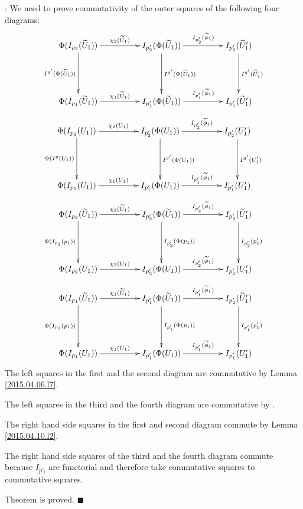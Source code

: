 \documentclass[12pt]{article}
\numberwithin{equation}{section}
\newenvironment{myproof}{{\bf Proof}:}{$\blacksquare$ \vskip 5mm }
\newcommand{\wt}{\widetilde}
\begin{document}
\begin{myproof}
We need to prove commutativity of the outer squares of the following four diagrams:
%
$$
\begin{xy}
          \xymatrix@C=4pc@R=4pc{
                 \Phi(I_{p_2}(\wt{U}_1))  \ar[r]^-{\chi_2(\wt{U}_1)} \ar[d]_-{I^{g'}(\Phi(\wt{U}_1))} & 
                 I_{p_2'}(\Phi(\wt{U}_1)) \ar[r]^-{I_{p_2'}(\wt{\phi}_1)} \ar[d]^-{I^{g'}(\Phi(\wt{U}_1))} &
		I_{p_2'}(\wt{U}_1') \ar[d]^-{ I^{g'}(\wt{U}_1')} \\
		\Phi(I_{p_1}(\wt{U}_1))  \ar[r]^-{\chi_1(\wt{U}_1)} &
		I_{p_1'}(\Phi(\wt{U}_1)) \ar[r]^-{I_{p_1'}(\wt{\phi}_1)} &
		I_{p_1'}(\wt{U}_1')
                }
\end{xy}
$$
%
$$
\begin{xy}
          \xymatrix@C=4pc@R=4pc{ \Phi(I_{p_2}(U_1)) \ar[r]^-{\chi_2(U_1)}
            \ar[d]_-{\Phi(I^g(U_1))} & I_{p_2'}(\Phi(U_1))
            \ar[r]^-{I_{p_2'}(\wt{\phi}_1)} \ar[d]^-{I^{g'}(\Phi(U_1))} &
            I_{p_2'}(U_1') \ar[d]^-{I^{g'}(U_1')} \\ \Phi(I_{p_1}(U_1))
            \ar[r]^-{\chi_1(U_1)} & I_{p_1'}(\Phi(U_1))
            \ar[r]^-{I_{p_1'}(\wt{\phi}_1)} & I_{p_1'}(U_1') }
\end{xy}
$$
%
$$
\begin{xy}
          \xymatrix@C=4pc@R=4pc{ \Phi(I_{p_2}(\wt{U}_1))
            \ar[r]^-{\chi_2(\wt{U}_1)} \ar[d]_-{\Phi(I_{p_2}(p_1))} &
            I_{p_2'}(\Phi(\wt{U}_1)) \ar[r]^-{I_{p_2'}(\wt{\phi}_1)}
            \ar[d]^-{I_{p_2'}(\Phi(p_1))} & I_{p_2'}(\wt{U}_1')
            \ar[d]^-{I_{p_2'}(p_1')} \\ \Phi(I_{p_2}(U_1))
            \ar[r]^-{\chi_2(U_1)} & I_{p_2'}(\Phi(U_1))
            \ar[r]^-{I_{p_2'}(\wt{\phi}_1)} & I_{p_2'}(U_1') }
\end{xy}
$$
%
$$
\begin{xy}
          \xymatrix@C=4pc@R=4pc{ \Phi(I_{p_1}(\wt{U}_1))
            \ar[r]^-{\chi_1(\wt{U}_1)} \ar[d]_-{\Phi(I_{p_1}(p_1))} &
            I_{p_1'}(\Phi(\wt{U}_1)) \ar[r]^-{I_{p_1'}(\wt{\phi}_1)}
            \ar[d]^-{I_{p_1'}(\Phi(p_1))} & I_{p_2'}(\wt{U}_1')
            \ar[d]^-{I_{p_1'}(p_1')} \\ \Phi(I_{p_1}(U_1))
            \ar[r]^-{\chi_1(U_1)} & I_{p_1'}(\Phi(U_1))
            \ar[r]^-{I_{p_1'}(\wt{\phi}_1)} & I_{p_1'}(U_1') }
\end{xy}
$$
%
The left squares in the first and the second diagram are commutative by Lemma
\ref{2015.04.06.l7}.

The left squares in the third and the fourth diagram are commutative by
\cite[Lemma 5.7]{fromunivwithPi}.

The right hand side squares in the first and second diagram commute by Lemma
\ref{2015.04.10.l2}.

The right hand side squares of the third and the fourth diagram commute because
$I_{p'_i}$ are functorial and therefore take commutative squares to commutative
squares.

Theorem is proved.
\end{myproof}
\end{document}
